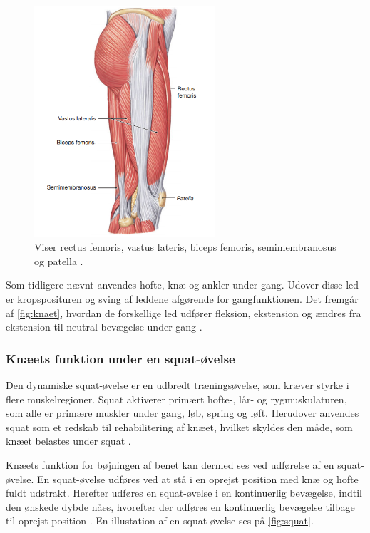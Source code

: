 \begin{figure} [H]
\centering
\includegraphics[width=0.6\textwidth]{figures/laarmuskler}
\caption{Viser rectus femoris, vastus lateris, biceps femoris, semimembranosus og patella  \citep{martini2012}.}
\label{fig:knaet}
\end{figure} 

Som tidligere nævnt anvendes hofte, knæ og ankler under gang. Udover disse led er kropsposituren og sving af leddene afgørende for gangfunktionen. Det fremgår af \autoref{fig:knaet}, hvordan de forskellige led udfører fleksion, ekstension og ændres fra ekstension til neutral bevægelse under gang \citep{martini2012}.

\subsubsection{Knæets funktion under en squat-øvelse} \label{sec:knaeled_squat}
Den dynamiske squat-øvelse er en udbredt træningsøvelse, som kræver styrke i flere muskelregioner. Squat aktiverer primært hofte-, lår- og rygmuskulaturen, som alle er primære muskler under gang, løb, spring og løft. Herudover anvendes squat som et redskab til rehabilitering af knæet, hvilket skyldes den måde, som knæet belastes under squat \citep{escamilla2001}. 

Knæets funktion for bøjningen af benet kan dermed ses ved udførelse af en squat-øvelse. En squat-øvelse udføres ved at stå i en oprejst position med knæ og hofte fuldt udstrakt. Herefter udføres en squat-øvelse i en kontinuerlig bevægelse, indtil den ønskede dybde nåes, hvorefter der udføres en kontinuerlig bevægelse tilbage til oprejst position \citep{escamilla2001}. En illustation af en squat-øvelse ses på \autoref{fig:squat}.

